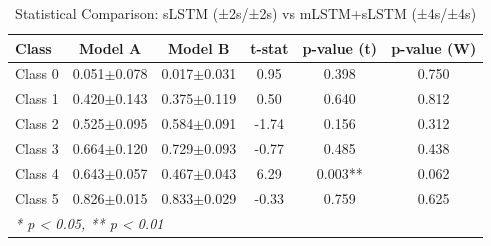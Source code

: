 \begin{table}[htbp]
\centering
\caption{Statistical Comparison: sLSTM (±2s/±2s) vs mLSTM+sLSTM (±4s/±4s)}
\label{tab:comparison_class_slstm_±2s_±2s_vs_mlstmslstm_±4s_±4s}
\begin{tabular}{lccccc}
\toprule
\textbf{Class} & \textbf{Model A} & \textbf{Model B} & \textbf{t-stat} & \textbf{p-value (t)} & \textbf{p-value (W)} \\
\midrule
Class 0 & 0.051$\pm$0.078 & 0.017$\pm$0.031 & 0.95 & 0.398 & 0.750 \\
Class 1 & 0.420$\pm$0.143 & 0.375$\pm$0.119 & 0.50 & 0.640 & 0.812 \\
Class 2 & 0.525$\pm$0.095 & 0.584$\pm$0.091 & -1.74 & 0.156 & 0.312 \\
Class 3 & 0.664$\pm$0.120 & 0.729$\pm$0.093 & -0.77 & 0.485 & 0.438 \\
Class 4 & 0.643$\pm$0.057 & 0.467$\pm$0.043 & 6.29 & 0.003** & 0.062 \\
Class 5 & 0.826$\pm$0.015 & 0.833$\pm$0.029 & -0.33 & 0.759 & 0.625 \\
\bottomrule
\multicolumn{6}{l}{\textit{* p < 0.05, ** p < 0.01}} \\
\end{tabular}
\end{table}